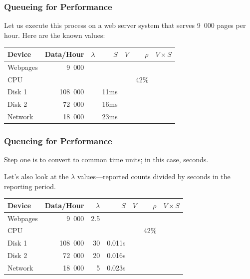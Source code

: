 \begin{frame}
\frametitle{Queueing for Performance}

\begin{changemargin}{1cm}
\large Let us execute this process on a web server system that serves 9~000 pages per hour. Here are the known values:
\end{changemargin}

\begin{center}
\begin{tabular}{l|r|r|r|r|r|r} 
	\textbf{Device} & \textbf{Data/Hour} & \textbf{$\lambda$} & \textbf{$S$} & \textbf{$V$} & \textbf{$\rho$} & \textbf{$V \times S$} \\ \hline
	Webpages & 9~000 & & & & & \\ \hline
	CPU & & & & &  42\% & \\ \hline
	Disk 1 & 108~000 & & 11ms & & &\\ \hline
	Disk 2 & 72~000 & & 16ms & & &\\ \hline
	Network & 18~000 & & 23ms & & &\\ 
\end{tabular}
\end{center}

\end{frame}



\begin{frame}
\frametitle{Queueing for Performance}

\begin{changemargin}{1cm}
\large 
Step one is to convert to common time units; in this case, seconds.

Let's also look at the $\lambda$ values---reported counts divided by seconds in the reporting period.
\end{changemargin}

\begin{center}
\begin{tabular}{l|r|r|r|r|r|r} 
	\textbf{Device} & \textbf{Data/Hour} & \textbf{$\lambda$} & \textbf{$S$} & \textbf{$V$} & \textbf{$\rho$} & \textbf{$V \times S$} \\ \hline
	Webpages & 9~000 & 2.5 & & & & \\ \hline
	CPU & & & & & 42\% & \\ \hline
	Disk 1 & 108~000 & 30 & 0.011s  & & &\\ \hline
	Disk 2 & 72~000 & 20 & 0.016s & & &\\ \hline
	Network & 18~000 & 5 & 0.023s & & &
\end{tabular}
\end{center}

\end{frame}



